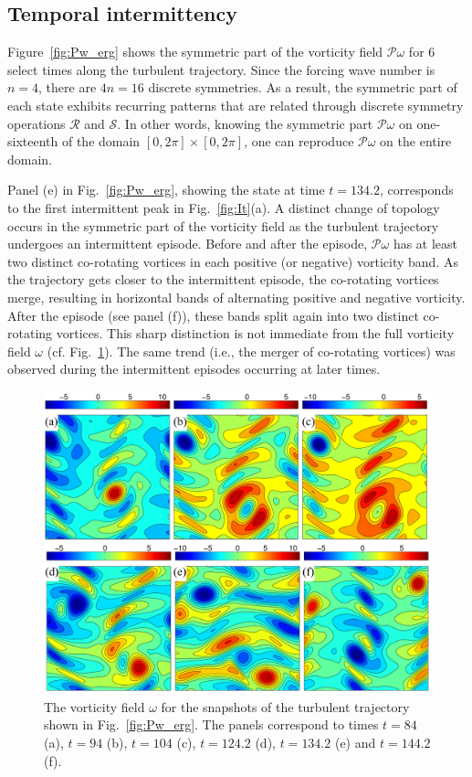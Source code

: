 \documentclass{jfm}
\begin{document}
\subsection{Temporal intermittency}
Figure~\ref{fig:Pw_erg} shows the symmetric part of the vorticity field $\mathcal P\omega$
for 6 select times along the turbulent trajectory. Since the forcing wave number is
$n=4$, there are $4n=16$ discrete symmetries. As a result, the symmetric part of each state
exhibits recurring patterns that are related through discrete symmetry operations $\mathcal R$
and $\mathcal S$. In other words, knowing the symmetric part $\mathcal P\omega$ on one-sixteenth of
the domain $[0,2\pi]\times[0,2\pi]$, one can reproduce $\mathcal P\omega$ on the entire domain.

Panel (e) in Fig.~\ref{fig:Pw_erg}, showing the state at time $t=134.2$,
corresponds to the first intermittent peak in Fig.~\ref{fig:It}(a). A
distinct change of topology occurs in the symmetric part of
the vorticity field as the turbulent trajectory undergoes an intermittent episode.
Before and after the episode, $\mathcal P\omega$ has at least two
distinct co-rotating vortices in each positive (or negative) vorticity band. As the trajectory
gets closer to the intermittent episode, the co-rotating vortices merge, resulting
in horizontal bands of alternating positive and negative vorticity. After the episode
(see panel (f)), these bands split again into two distinct co-rotating vortices.
This sharp distinction is not immediate from the full vorticity field $\omega$
(cf. Fig.~\ref{fig:w_erg}).
The same trend (i.e., the merger of co-rotating vortices) was observed during
the intermittent episodes occurring at later times.
\begin{figure}
\centering
\includegraphics[width=\textwidth]{R40_w}
\caption{The vorticity field $\omega$ for the snapshots of the turbulent trajectory 
shown in Fig.~\ref{fig:Pw_erg}. The panels correspond to times
$t=84$ (a),
$t=94$ (b),
$t=104$ (c),
$t=124.2$ (d),
$t=134.2$ (e) and
$t=144.2$ (f).
}
\label{fig:w_erg}
\end{figure}
\end{document}
